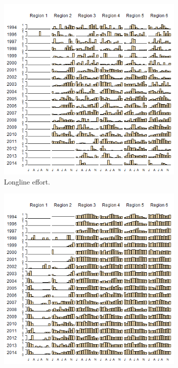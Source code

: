 \documentclass[12pt]{SCreport}
\begin{document}
\begin{landscape}
\begin{figure}
\centering
   \begin{subfigure}[b]{0.6\textwidth}
       \includegraphics[width=\textwidth]{../GRAPHICS/Defined/FIG_06a_obsBY_mm_RDS}
       \caption{Longline effort.}
       \label{fig:test1}
   \end{subfigure}
   \begin{subfigure}[b]{0.6\textwidth}
       \includegraphics[width=\textwidth]{../GRAPHICS/Defined/FIG_06b_LOGSHEET_mm_RDS}

\end{subfigure}
\end{figure}
\end{landscape}
\end{document}
